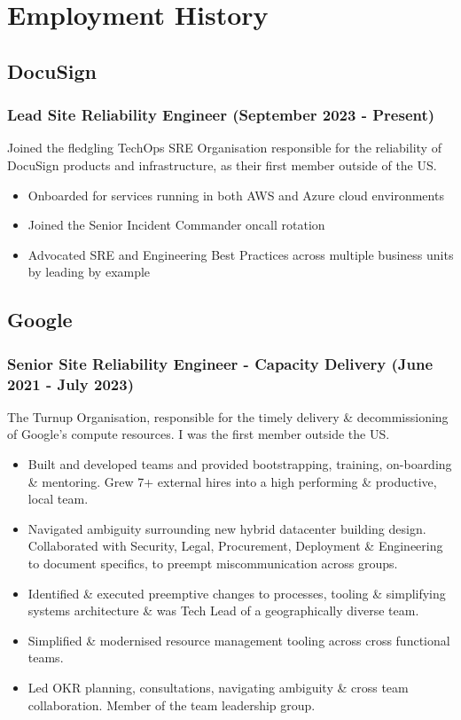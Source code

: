 \documentclass[a4paper, 10pt] {article}
\begin{document}
\newpage

\section*{Employment History}

\subsection*{DocuSign}

\subsubsection*{Lead Site Reliability Engineer (September 2023 - Present)}

Joined the fledgling TechOps SRE Organisation responsible for the reliability of DocuSign products and infrastructure,
as their first member outside of the US.

\begin{itemize}[noitemsep]
	\item Onboarded for services running in both AWS and Azure cloud environments
 	\item Joined the Senior Incident Commander oncall rotation
 	\item Advocated SRE and Engineering Best Practices across multiple business units by leading by example
\end{itemize}

\subsection*{Google}

\subsubsection*{Senior Site Reliability Engineer - Capacity Delivery (June 2021 - July 2023)}

The Turnup Organisation, responsible for the timely delivery \&
decommissioning of Google's compute resources. I was the first member
outside the US.

\begin{itemize}[noitemsep]
	\item Built and developed teams and provided bootstrapping, training, 
		on-boarding \& mentoring. Grew 7+ external hires into a high performing \&
		productive, local team.
  	\item Navigated ambiguity surrounding new hybrid datacenter building design.
		Collaborated with Security, Legal, Procurement, Deployment \& 
		Engineering to document specifics, to preempt miscommunication across groups.
	\item Identified \& executed preemptive changes to processes, tooling \& simplifying systems
		architecture \& was Tech Lead of a geographically diverse team.
	\item Simplified \& modernised resource management tooling across cross functional teams.
	\item Led OKR planning, consultations, navigating ambiguity \& cross team collaboration. Member
		of the team leadership group.
\end{itemize}
\end{document}
